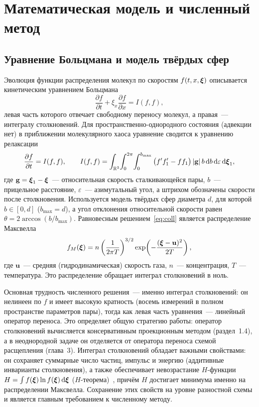 \chapter{Математическая модель и численный метод}

\section{Уравнение Больцмана и модель твёрдых сфер}

Эволюция функции распределения молекул по скоростям $f(t,x,\boldsymbol{\xi})$ описывается кинетическим уравнением Больцмана
\begin{equation}
  \frac{\partial f}{\partial t} + \xi_x\frac{\partial f}{\partial x} = I(f,f),
  \label{eq:cbe}
\end{equation}
левая часть которого отвечает свободному переносу молекул, а правая~--- интегралу столкновений.
Для пространственно-однородного состояния (адвекции нет) в приближении молекулярного хаоса уравнение сводится к
уравнению релаксации
\begin{equation}
  \frac{\partial f}{\partial t} = I(f,f),\qquad
  I(f,f)=\int_{\mathbb{R}^3}\!\int_0^{2\pi}\!\int_0^{b_{\max}}\big(f'f'_1-f f_1\big)\,|\mathbf{g}|\,b\,\mathrm{d} b\,\mathrm{d}\varepsilon\,\mathrm{d}\boldsymbol{\xi}_1,
  \label{eq:coll}
\end{equation}
где $\mathbf{g}=\boldsymbol{\xi}_1-\boldsymbol{\xi}$~--- относительная скорость сталкивающейся пары, $b$~--- прицельное расстояние, $\varepsilon$~---
азимутальный угол, а штрихом обозначены скорости после столкновения.
Используется модель твёрдых сфер диаметра $d$, для которой $b\in[0,d]$ ($b_{\max}=d$), а угол отклонения относительной
скорости равен $\theta=2\arccos(b/b_{\max})$.
Равновесным решением~\eqref{eq:coll} является распределение Максвелла
\begin{equation}
  f_M(\boldsymbol{\xi})=n\left(\frac{1}{2\pi T}\right)^{3/2}\exp\!\left(-\frac{(\boldsymbol{\xi}-\mathbf u)^2}{2T}\right),
  \label{eq:Maxwell}
\end{equation}
где $\mathbf u$~--- средняя (гидродинамическая) скорость газа, $n$~--- концентрация, $T$~--- температура.
Это распределение обращает интеграл столкновений в ноль.

Основная трудность численного решения~--- именно интеграл столкновений: он нелинеен по $f$ и имеет высокую кратность
(восемь измерений в полном пространстве параметров пары), тогда как левая часть уравнения~--- линейный оператор
переноса.
Это определяет общую стратегию работы: оператор столкновений вычисляется консервативным проекционным методом
(раздел~1.4), а в неоднородной задаче он отделяется от оператора переноса схемой расщепления (глава~3).
Интеграл столкновений обладает важными свойствами: он сохраняет суммарные число частиц, импульс и энергию (аддитивные
инварианты столкновения), а также обеспечивает невозрастание $H$-функции $H = \int f(\boldsymbol{\xi}) \ln f(\boldsymbol{\xi}) \,\mathrm{d}\boldsymbol{\xi}$
($H$-теорема)~\cite{LL10,Kogan}, причём $H$ достигает минимума именно на распределении Максвелла.
Сохранение этих свойств на уровне разностной схемы и является главным требованием к численному методу.

